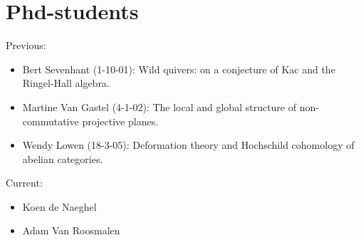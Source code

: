 \documentclass{amsart}
\begin{document}
\section*{Phd-students}
\noindent Previous:
\begin{itemize}
\item Bert Sevenhant (1-10-01): Wild quivers: on a conjecture of Kac
  and the Ringel-Hall algebra.
\item Martine Van Gastel (4-1-02): The local and global structure of
  non-commutative projective planes.
\item
Wendy Lowen (18-3-05): Deformation theory and Hochschild cohomology
of abelian categories.
\end{itemize}
Current:
\begin{itemize}
\item Koen de Naeghel
\item Adam Van Roosmalen
\end{itemize}
\end{document}
